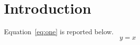 \documentclass{article}
\begin{document}
\section{Introduction}\label{sec:intro}
Equation~\eqref{eq:one} is reported below.
\begin{equation}\label{eq:one}
 y = x
\end{equation}
\end{document}
